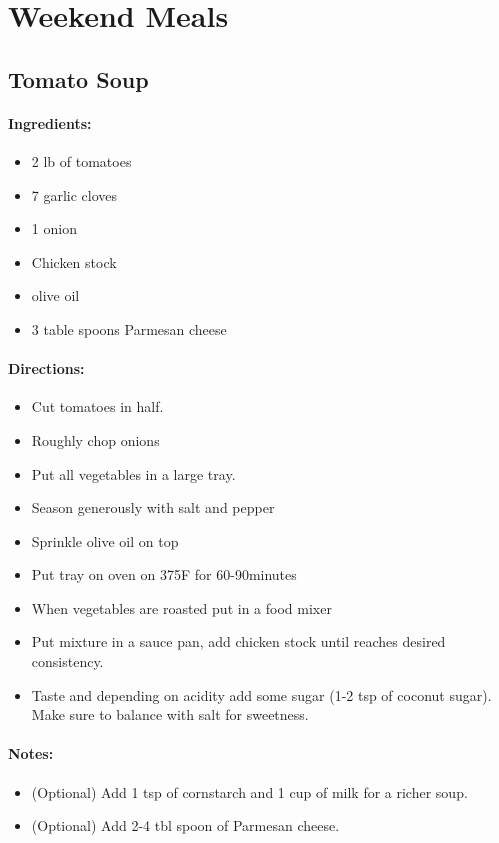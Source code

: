 \documentclass{article}
\begin{document}
\section{Weekend Meals}

\subsection{Tomato Soup}

\paragraph{Ingredients:}
\begin{itemize}
	\item 2 lb of tomatoes
	\item 7 garlic cloves
	\item 1 onion
	\item Chicken stock
	\item olive oil
	\item 3 table spoons Parmesan cheese
\end{itemize}

\paragraph{Directions:}
\begin{itemize}
	\item Cut tomatoes in half.
	\item Roughly chop onions
	\item Put all vegetables in a large tray.
	\item Season generously with salt and pepper
	\item Sprinkle olive oil on top
	\item Put tray on oven on 375F for 60-90minutes
	\item When vegetables are roasted put in a food mixer
	\item Put mixture in a sauce pan, add chicken stock until reaches desired consistency.
	\item Taste and depending on acidity add some sugar (1-2 tsp of coconut sugar). Make sure to balance with salt for sweetness.
\end{itemize}

\paragraph{Notes:}
\begin{itemize}
	\item (Optional) Add 1 tsp of cornstarch and 1 cup of milk for a richer soup.
	\item (Optional) Add 2-4 tbl spoon of Parmesan cheese.
\end{itemize}
\end{document}
